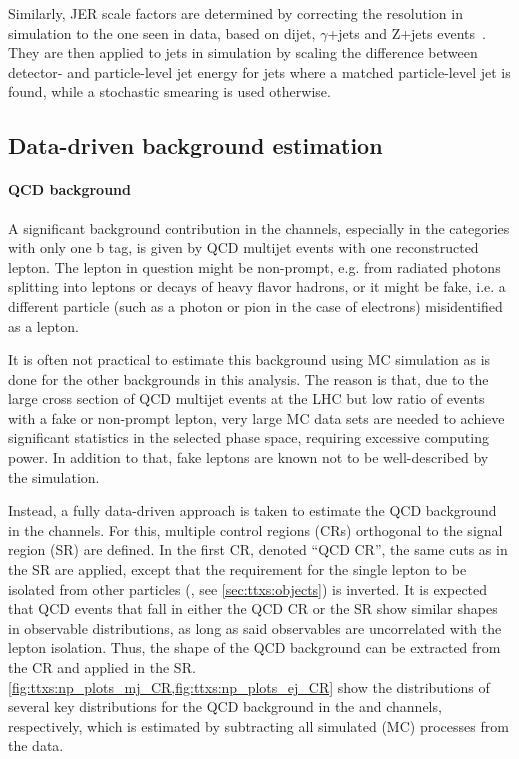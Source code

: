 Similarly, JER scale factors are determined by correcting the resolution in simulation to the one seen in data, based on dijet, $\gamma$+jets and Z+jets events~\cite{CMS:JME-10-011}. They are then applied to jets in simulation by scaling the difference between detector- and particle-level jet energy for jets where a matched particle-level jet is found, while a stochastic smearing is used otherwise.


\subsection{Data-driven background estimation}
\label{sec:ttxs:datadriven}

\paragraph{QCD background}

A significant background contribution in the \ljets channels, especially in the categories with only one b tag, is given by QCD multijet events with one reconstructed lepton. The lepton in question might be non-prompt, e.g. from radiated photons splitting into leptons or decays of heavy flavor hadrons, or it might be fake, i.e. a different particle (such as a photon or pion in the case of electrons) misidentified as a lepton.

It is often not practical to estimate this background using MC simulation as is done for the other backgrounds in this analysis. The reason is that, due to the large cross section of QCD multijet events at the LHC but low ratio of events with a fake or non-prompt lepton, very large MC data sets are needed to achieve significant statistics in the selected phase space, requiring excessive computing power. In addition to that, fake leptons are known not to be well-described by the simulation.

Instead, a fully data-driven approach is taken to estimate the QCD background in the \ljets channels. For this, multiple control regions (CRs) orthogonal to the signal region (SR) are defined. In the first CR, denoted ``QCD CR'', the same cuts as in the SR are applied, except that the requirement for the single lepton to be isolated from other particles (\Irel, see \cref{sec:ttxs:objects}) is inverted. It is expected that QCD events that fall in either the QCD CR or the SR show similar shapes in observable distributions, as long as said observables are uncorrelated with the lepton isolation. Thus, the shape of the QCD background can be extracted from the CR and applied in the SR. \cref{fig:ttxs:np_plots_mj_CR,fig:ttxs:np_plots_ej_CR} show the distributions of several key distributions for the QCD background in the \mujets and \ejets channels, respectively, which is estimated by subtracting all simulated (MC) processes from the data.

